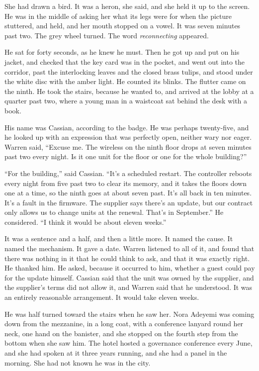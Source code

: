 She had drawn a bird. It was a heron, she said, and she held it up to the screen. He was in the middle of asking her what its legs were for when the picture stuttered, and held, and her mouth stopped on a vowel. It was seven minutes past two. The grey wheel turned. The word \emph{reconnecting} appeared.

He sat for forty seconds, as he knew he must. Then he got up and put on his jacket, and checked that the key card was in the pocket, and went out into the corridor, past the interlocking leaves and the closed brass tulips, and stood under the white disc with the amber light. He counted its blinks. The flutter came on the ninth. He took the stairs, because he wanted to, and arrived at the lobby at a quarter past two, where a young man in a waistcoat sat behind the desk with a book.

His name was Cassian, according to the badge. He was perhaps twenty-five, and he looked up with an expression that was perfectly open, neither wary nor eager. Warren said, ``Excuse me. The wireless on the ninth floor drops at seven minutes past two every night. Is it one unit for the floor or one for the whole building?''

``For the building,'' said Cassian. ``It's a scheduled restart. The controller reboots every night from five past two to clear its memory, and it takes the floors down one at a time, so the ninth goes at about seven past. It's all back in ten minutes. It's a fault in the firmware. The supplier says there's an update, but our contract only allows us to change units at the renewal. That's in September.'' He considered. ``I think it would be about eleven weeks.''

It was a sentence and a half, and then a little more. It named the cause. It named the mechanism. It gave a date. Warren listened to all of it, and found that there was nothing in it that he could think to ask, and that it was exactly right. He thanked him. He asked, because it occurred to him, whether a guest could pay for the update himself. Cassian said that the unit was owned by the supplier, and the supplier's terms did not allow it, and Warren said that he understood. It was an entirely reasonable arrangement. It would take eleven weeks.

He was half turned toward the stairs when he saw her. Nora Adeyemi was coming down from the mezzanine, in a long coat, with a conference lanyard round her neck, one hand on the banister, and she stopped on the fourth step from the bottom when she saw him. The hotel hosted a governance conference every June, and she had spoken at it three years running, and she had a panel in the morning. She had not known he was in the city.

